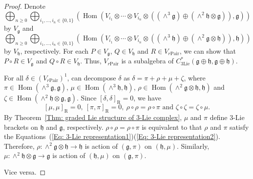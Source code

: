 \documentclass[12pt]{amsart}
\theoremstyle{definition}
\begin{document}
\begin{proof}
	Denote $$\bigoplus_{n \geq 0} \bigoplus_{i_1, \ldots, i_n \in \{0,1\}} \left(
	\operatorname{Hom}(V_{i_1} \otimes \cdots \otimes V_{i_n} \otimes \left( (\wedge^3\mathfrak{g})\oplus (\wedge^2\mathfrak{h}\otimes\mathfrak{g})\right) , \mathfrak{g})
	\right)$$ by $V_{\mathfrak{g}}$ and $$ \bigoplus_{n \geq 0} \bigoplus_{i_1, \ldots, i_n \in \{0,1\}} \left(
	\operatorname{Hom}(V_{i_1} \otimes \cdots \otimes V_{i_n} \otimes \left( (\wedge^3\mathfrak{h})\oplus (\wedge^2\mathfrak{g}\otimes\mathfrak{h})\right) , \mathfrak{h})
	\right)$$ by $V_{\mathfrak{h}}$, respectively.  For each $P\in V_{\mathfrak{g}}$, $Q\in V_{\mathfrak{h}} $ and $R\in V_{r\mathrm{Pair}}$, we can show that $P \circ R\in V_{\mathfrak{g}}$ and $Q\circ R\in V_{\mathfrak{h}}$. Thus,  $V_{r\mathrm{Pair}}$ is a subalgebra of $ C^*_{\mathrm{3Lie}}(\mathfrak{g}\oplus\mathfrak{h}, \mathfrak{g}\oplus\mathfrak{h})$.
	
	
	For all $\delta\in (V_{r\mathrm{Pair}})^1$,  can decompose
	$\delta$ as $\delta=\pi+\rho+ \mu+\zeta $, where  $\pi\in \operatorname{Hom}(\wedge^3\mathfrak{g},\mathfrak{g})$, $\mu\in \operatorname{Hom}(\wedge^3\mathfrak{h},\mathfrak{h})$, $\rho\in \operatorname{Hom}(\wedge^2 \mathfrak{g}\otimes \mathfrak{h}  , \mathfrak{h})$ and  $\zeta\in \operatorname{Hom}(\wedge^2 \mathfrak{h}\otimes \mathfrak{g}  , \mathfrak{g})$.  Since $[\delta,\delta]_{\mathrm{R}}=0$, we have \[[\mu,\mu]_{\mathrm{R}}=0,\ [\pi,\pi]_{\mathrm{R}}=0,\ \rho\circ \rho=\rho\circ\pi \text{ and } \zeta\circ \zeta=\zeta\circ\mu.\] By Theorem~\ref{Thm: graded Lie structure of 3-Lie complex}, $\mu$ and $\pi$ define 3-Lie brackets on $\mathfrak{h}$ and $\mathfrak{g}$, respectively. $\rho\circ \rho=\rho\circ\pi$ is equivalent to that $\rho$ and $\pi$ satisfy the Equations~(\ref{Eq: 3-Lie representation1})(\ref{Eq: 3-Lie representation2}). Therefore,  $ \rho: \wedge^2 \mathfrak{g}\otimes \mathfrak{h} \rightarrow  \mathfrak{h}$ is action of   $\left(\mathfrak{g},\pi\right)$ on   $\left(\mathfrak{h},\mu\right)$. Similarly, $ \mu: \wedge^2 \mathfrak{h}\otimes \mathfrak{g} \rightarrow  \mathfrak{g}$ is action of $\left(\mathfrak{h},\mu\right)$   on   $\left(\mathfrak{g},\pi\right)$.
	
	Vice versa.
\end{proof}
\end{document}
